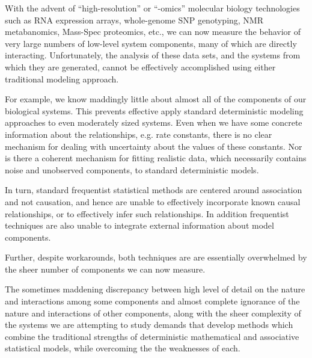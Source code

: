 \documentclass{article}
\begin{document}
  With the advent of ``high-resolution'' or ``-omics'' molecular
  biology technologies such as RNA expression arrays, whole-genome SNP
  genotyping, NMR metabanomics, Mass-Spec proteomics, etc., we can now
  measure the behavior of very large numbers of low-level system
  components, many of which are directly interacting. Unfortunately,
  the analysis of these data sets, and the systems from which they are
  generated, cannot be effectively accomplished using either
  traditional modeling approach.
  
  For example, we know maddingly little about almost all of the
  components of our biological systems.  This prevents effective apply
  standard deterministic modeling approaches to even moderately sized
  systems.  Even when we have some concrete information about the
  relationships, e.g. rate constants, there is no clear mechanism for
  dealing with uncertainty about the values of these constants.  Nor
  is there a coherent mechanism for fitting realistic data, which
  necessarily contains noise and unobserved components, to standard
  deterministic models.
  
  In turn, standard frequentist statistical methods are centered
  around association and not causation, and hence are unable to
  effectively incorporate known causal relationships, or to
  effectively infer such relationships.  In addition frequentist
  techniques are also unable to integrate external information about
  model components.
  
  Further, despite workarounds, both techniques are are essentially
  overwhelmed by the sheer number of components we can now measure.
  
  The sometimes maddening discrepancy between high level of detail on
  the nature and interactions among some components and almost
  complete ignorance of the nature and interactions of other
  components, along with the sheer complexity of the systems we are
  attempting to study demands that develop methods which combine the
  traditional strengths of deterministic mathematical and associative
  statistical models, while overcoming the the weaknesses of each.
  
\end{document}
